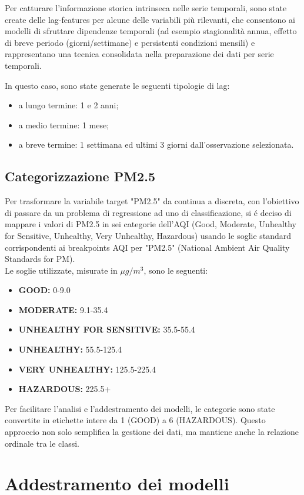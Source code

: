 \documentclass[a4paper,12pt]{report}
\begin{document}
	Per catturare l'informazione storica intrinseca nelle serie temporali, sono state create delle lag-features per alcune delle variabili più rilevanti, che consentono ai modelli di sfruttare dipendenze temporali (ad esempio stagionalità annua, effetto di breve periodo (giorni/settimane) e persistenti condizioni mensili) e rappresentano una tecnica consolidata nella preparazione dei dati per serie temporali.
	
	In questo caso, sono state generate le seguenti tipologie di lag:
	\begin{itemize}
		\item a lungo termine: 1 e 2 anni;
		\item a medio termine: 1 mese;
		\item a breve termine: 1 settimana ed ultimi 3 giorni dall'osservazione selezionata.
	\end{itemize}
	
	\subsection{Categorizzazione PM2.5}
	Per trasformare la variabile target "PM2.5" da continua a discreta, con l'obiettivo di passare da un problema di regressione ad uno di classificazione, si é deciso di mappare i valori di PM2.5 in sei categorie dell'AQI (Good, Moderate, Unhealthy for Sensitive, Unhealthy, Very Unhealthy, Hazardous) usando le soglie standard corrispondenti ai breakpoints AQI per "PM2.5" (National Ambient Air Quality Standards for PM). \\
	Le soglie utilizzate, misurate in $\mu g/m^3$, sono le seguenti:
	\begin{itemize}
		\item \textbf{GOOD:} 0-9.0
		\item \textbf{MODERATE:} 9.1-35.4
		\item \textbf{UNHEALTHY FOR SENSITIVE:} 35.5-55.4
		\item \textbf{UNHEALTHY:} 55.5-125.4
		\item \textbf{VERY UNHEALTHY:} 125.5-225.4
		\item \textbf{HAZARDOUS:} 225.5+
	\end{itemize}
	Per facilitare l'analisi e l'addestramento dei modelli, le categorie sono state convertite in etichette intere da 1 (GOOD) a 6 (HAZARDOUS). Questo approccio non solo semplifica la gestione dei dati, ma mantiene anche la relazione ordinale tra le classi.
	
	\section{Addestramento dei modelli}
	
\end{document}
